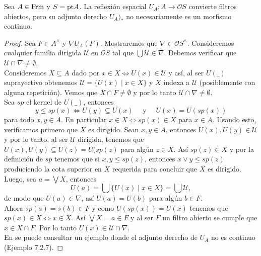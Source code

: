\begin{thm}\label{Teorema7.2.5}
    Sea $A\in \mathrm{Frm}$ y $S=\mathrm{pt} A$. La reflexión espacial $U_A\colon A\to \mathcal{O}S$ convierte filtros abiertos, pero su adjunto derecho $U_A)_*$ no necesariamente es un morfismo continuo.
\end{thm}

\begin{proof}
    Sea $F\in A^\wedge$ y $\nabla U_A(F)$. Mostraremos que $\nabla\in \mathcal{O}S^\wedge$. Consideremos cualquier familia dirigida $\mathcal{U}$ en $\mathcal{O}S$ tal que $\bigcup\mathcal{U}\in \nabla$. Debemos verificar que $\mathcal{U}\cap \nabla\neq \emptyset$.\\

    Consideremos $X\subseteq A$ dado por $x\in X\Leftrightarrow U(x)\in \mathcal{U}$ y así, al ser $U( \_ )$ suprayectivo obtenemos $\mathcal{U}=\{U(x)\mid x\in X\}$ y $X$ indexa a $\mathcal{U}$ (posiblemente con alguna repetición). Vemos que $X\cap F\neq \emptyset$ y por lo tanto $\mathcal{U}\cap \nabla\neq \emptyset$.\\

    Sea $sp$ el kernel de $U( \_ )$, entonces
    \[
    y\leq sp(x)\Leftrightarrow U(y)\subseteq U(x)\quad \mbox{ y }\quad U(x)=U(sp(x))
    \]
    para todo $x, y \in A$. En particular $x\in X\Leftrightarrow sp(x)\in X$ para $x\in A$. Usando esto, verificamos primero que $X$ es dirigido. Sean $x, y\in A$, entonces $U(x), U(y)\in \mathcal{U}$ y por lo tanto, al ser $\mathcal{U}$ dirigida, tenemos que $U(x), U(y)\subseteq U(z)=U(sp(z)$ para algún $z\in X$. Así $sp(z)\in X$ y por la definición de $sp$ tenemos que si $x, y\leq sp(z)$, entonces $x\vee y\leq sp(z)$ produciendo la cota superior en $X$ requerida para concluir que $X$ es dirigido.\\

    Luego, sea $a=\bigvee X$, entonces 
    \[
    U(a)=\bigcup\{U(x)\mid x\in X\}=\bigcup \mathcal{U},
    \]
    de modo que $U(a)\in \nabla$, así $U(a)=U(b)$ para algún $b\in  F$.\\
    
    Ahora $sp(a)=s(b)\in F$ y como $U(sp(x))=U(x)$ tenemos que $sp(x)\in X\Leftrightarrow x\in X$. Así $\bigvee X=a\in F$ y al ser $F$ un filtro abierto se cumple que $x\in X\cap F$. Por lo tanto $U(x)\in \mathcal{U}\cap \nabla$.\\

   En \cite{R.S.} se puede consultar un ejemplo donde el adjunto derecho de $U_A$ no es continuo (Ejemplo 7.2.7).
\end{proof}

